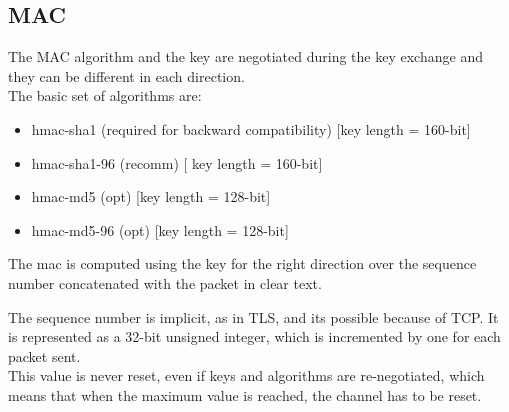 \subsection{MAC}
The MAC algorithm and the key are negotiated during the key exchange
and they can be different in each direction.\\
The basic set of algorithms are:
\begin{itemize}
  \item hmac-sha1 (required for backward compatibility) [key length =
    160-bit]
  \item hmac-sha1-96 (recomm) [ key length = 160-bit]
  \item hmac-md5 (opt) [key length = 128-bit]
  \item hmac-md5-96 (opt) [key length = 128-bit]
\end{itemize}
\begin{boxH}
  The mac is computed using the key for the right direction over the
  sequence number concatenated with the packet in clear text.
\end{boxH}
The sequence number is implicit, as in TLS, and its possible because 
of TCP. It is represented as a 32-bit unsigned integer, which is 
incremented by one for each packet sent.\\
This value is never reset, even if keys and algorithms are
re-negotiated, which means that when the maximum value is reached, the
channel has to be reset.
